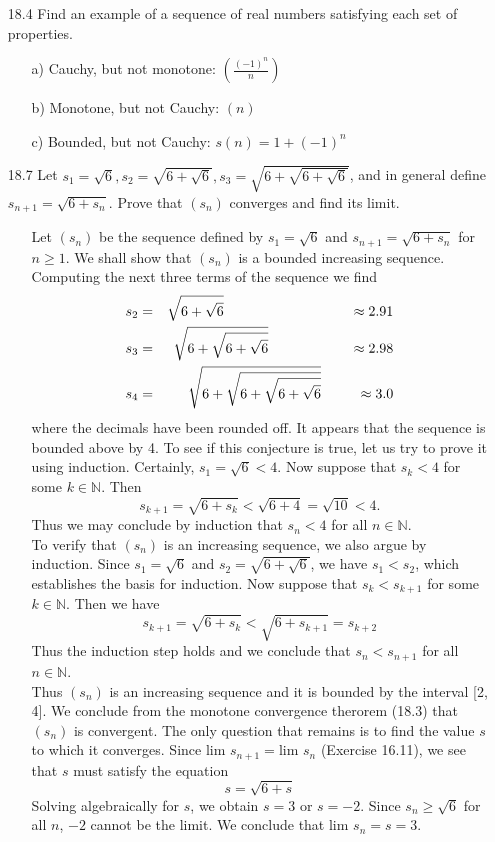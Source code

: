 \documentclass[12pt]{article}
\begin{document}
\begin{enumerate}
\begin{enumerate}
\item[18.4] Find an example of a sequence of real numbers satisfying each set of properties.
\begin{enumerate}
\item[a)] Cauchy, but not monotone: {\large $\left( \frac{(-1)^n}{n} \right)$}
\item[b)] Monotone, but not Cauchy: $(n)$
\item[c)] Bounded, but not Cauchy: $s(n) = 1 + (-1)^n$
\end{enumerate}

\item[18.7] Let $s_1 = \sqrt{6}, s_2 = \sqrt{6 + \sqrt{6}}, s_3 = \sqrt{6 + \sqrt{6 + \sqrt{6}}}$,
and in general define $s_{n+1} = \sqrt{6 + s_n}$. Prove that $(s_n)$ converges and find its limit.
\begin{enumerate}
\item[] Let $(s_n)$ be the sequence defined by $s_1 = \sqrt{6}$ and 
$s_{n + 1} = \sqrt{6 + s_n}$ for $n \geq 1$. We shall show that $(s_n)$ is a
bounded increasing sequence. Computing the next three terms of the sequence we find
\begin{eqnarray*}
s_2 &=& \sqrt{6 + \sqrt{6}} \hskip 3.17cm \approx 2.91 \\
s_3 &=& \sqrt{6 + \sqrt{6 + \sqrt{6}}} \hskip 2.05cm \approx 2.98 \\
s_4 &=& \sqrt{6 + \sqrt{6 + \sqrt{6 + \sqrt{6}}}} \hskip 0.9cm \approx 3.0
\end{eqnarray*}
where the decimals have been rounded off. It appears that the sequence is bounded
above by 4. To see if this conjecture is true, let us try to prove it using 
induction. Certainly, $s_1 = \sqrt{6} < 4$. Now suppose that $s_k < 4$ for 
some $k \in \mathbb{N}$. Then
\[
s_{k + 1} = \sqrt{6 + s_k} < \sqrt{6 + 4} = \sqrt{10} < 4.
\]
Thus we may conclude by induction that $s_n < 4$ for all $n \in \mathbb{N}$. \\
To verify that $(s_n)$ is an increasing sequence, we also argue by induction.
Since $s_1 = \sqrt{6}$ and $s_2 = \sqrt{6 + \sqrt{6}}$, we have $s_1 < s_2$, which
establishes the basis for induction. Now suppose that $s_k < s_{k + 1}$ for some
$k \in \mathbb{N}$. Then we have
\[
s_{k + 1} = \sqrt{6 + s_k} < \sqrt{6 + s_{k + 1}} = s_{k + 2}
\]
Thus the induction step holds and we conclude that $s_n < s_{n + 1}$ for all 
$n \in \mathbb{N}$. \\
Thus $(s_n)$ is an increasing sequence and it is bounded by the interval [2, 4].
We conclude from the monotone convergence therorem (18.3) that $(s_n)$ is 
convergent. The only question that remains is to find the value $s$ to which
it converges. Since lim $s_{n + 1} = $lim $s_n$ (Exercise 16.11), we see that $s$
must satisfy the equation 
\[
s = \sqrt{6 + s}
\]
Solving algebraically for $s$, we obtain $s = 3$ or $s = -2$. Since $s_n \geq \sqrt{6}$
for all $n$, $-2$ cannot be the limit. We conclude that lim $s_n = s = 3$.
\end{enumerate}



\end{enumerate}
\end{enumerate}
\end{document}
